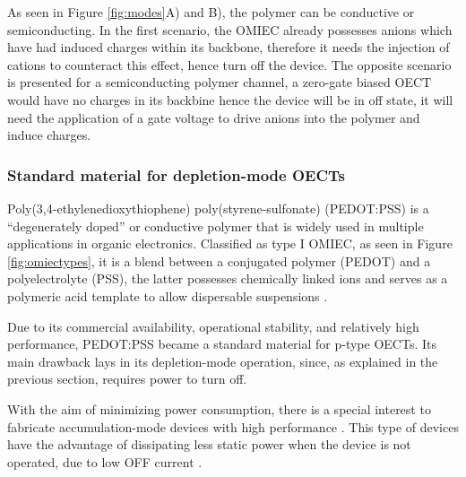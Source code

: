 As seen in Figure \ref{fig:modes}A) and B), the polymer can be conductive or semiconducting. In the first scenario, the OMIEC already possesses anions which have had induced charges within its backbone, therefore it needs the injection of cations to counteract this effect, hence turn off the device. The opposite scenario is presented for a semiconducting polymer channel, a zero-gate biased OECT would have no charges in its backbine hence the device will be in off state, it will need the application of a gate voltage to drive anions into the polymer and induce charges.

\subsubsection{Standard material for depletion-mode OECTs}

Poly(3,4-ethylenedioxythiophene) poly(styrene-sulfonate) (PEDOT:PSS) is a ``degenerately doped'' \cite{bernardsSteadyStateTransientBehavior2007} or conductive polymer that is widely used in multiple applications in organic electronics. Classified as type I OMIEC, as seen in Figure \ref{fig:omiectypes}, it is a blend between a conjugated polymer (PEDOT) and a polyelectrolyte (PSS), the latter possesses chemically linked ions and serves as a polymeric acid template to allow dispersable suspensions \cite{paulsenOrganicMixedIonic2020}.

Due to its commercial availability, operational stability, and relatively high performance, PEDOT:PSS became a standard material for p-type OECTs. Its main drawback lays in its depletion-mode operation, since, as explained in the previous section, requires power to turn off. 

With the aim of minimizing power consumption, there is a special interest to fabricate accumulation-mode devices with high performance \cite{nielsenMolecularDesignSemiconducting2016}\cite{tanOrganicMixedIonic2022}\cite{inalBenchmarkingOrganicMixed2017}\cite{keeneEnhancementModePEDOTPSS2020}. This type of devices have the advantage of dissipating less static power when the device is not operated, due to low OFF current %
\cite{giovannittiEnergeticControlRedoxActive2020}.

